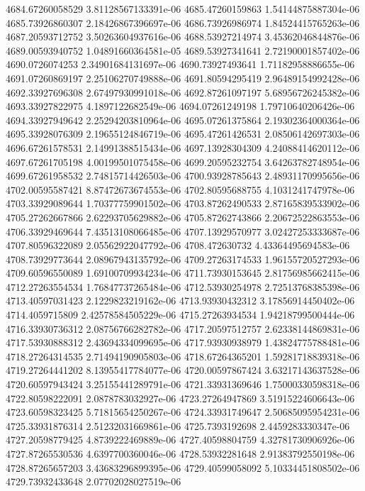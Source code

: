 {4684.67260058529 3.81128567133391e-06
4685.47260159863 1.54144875887304e-06
4685.73926860307 2.18426867396697e-06
4686.73926986974 1.84524415765263e-06
4687.20593712752 3.50263604937616e-06
4688.53927214974 3.45362046844876e-06
4689.00593940752 1.04891660364581e-05
4689.53927341641 2.72190001857402e-06
4690.0726074253 2.34901684131697e-06
4690.73927493641 1.71182958886655e-06
4691.07260869197 2.25106270749888e-06
4691.80594295419 2.96489154992428e-06
4692.33927696308 2.67497930991018e-06
4692.87261097197 5.68956726245382e-06
4693.33927822975 4.1897122682549e-06
4694.07261249198 1.79710640206426e-06
4694.33927949642 2.25294203810964e-06
4695.07261375864 2.19302364000364e-06
4695.33928076309 2.19655124846719e-06
4695.47261426531 2.08506142697303e-06
4696.67261578531 2.14991388515434e-06
4697.13928304309 4.24088414620112e-06
4697.67261705198 4.00199501075458e-06
4699.20595232754 3.64263782748954e-06
4699.67261958532 2.74815714426503e-06
4700.93928785643 2.48931170995656e-06
4702.00595587421 8.87472673674553e-06
4702.80595688755 4.1031241747978e-06
4703.33929089644 1.70377759901502e-06
4703.87262490533 2.87165839533902e-06
4705.27262667866 2.62293705629882e-06
4705.87262743866 2.20672522863553e-06
4706.33929469644 7.43513108066485e-06
4707.13929570977 3.02427253333687e-06
4707.80596322089 2.05562922047792e-06
4708.472630732 4.43364495694583e-06
4708.73929773644 2.08967943135792e-06
4709.27263174533 1.96155720527293e-06
4709.60596550089 1.69100709934234e-06
4711.73930153645 2.81756985662415e-06
4712.27263554534 1.76847737265484e-06
4712.53930254978 2.72513768385398e-06
4713.40597031423 2.1229823219162e-06
4713.93930432312 3.17856914450402e-06
4714.4059715809 2.42578584505229e-06
4715.27263934534 1.94218799500444e-06
4716.33930736312 2.08756766282782e-06
4717.20597512757 2.62338144869831e-06
4717.53930888312 2.43694334099695e-06
4717.93930938979 1.43824775788481e-06
4718.27264314535 2.71494190905803e-06
4718.67264365201 1.59281718839318e-06
4719.27264441202 8.13955417784077e-06
4720.00597867424 3.63217143637528e-06
4720.60597943424 3.25155441289791e-06
4721.33931369646 1.75000330598318e-06
4722.80598222091 2.0878783032927e-06
4723.27264947869 3.51915224606643e-06
4723.60598323425 5.71815654250267e-06
4724.33931749647 2.50685095954231e-06
4725.33931876314 2.51232031669861e-06
4725.7393192698 2.4459283330347e-06
4727.20598779425 4.8739222469889e-06
4727.40598804759 4.32781730906926e-06
4727.87265530536 4.6397700360046e-06
4728.53932281648 2.91383792550198e-06
4728.87265657203 3.43683296899395e-06
4729.40599058092 5.10334451808502e-06
4729.73932433648 2.07702028027519e-06
}
